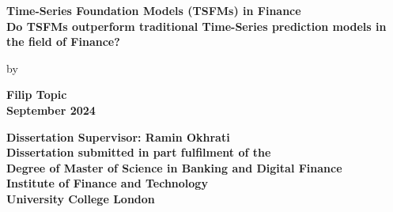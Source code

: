 \documentclass[12pt]{article}
\author{Filip Topic}
\numberwithin{figure}{section}
\numberwithin{table}{section}
\begin{document}
\begin{titlepage}
\begin{center}
    \vspace*{-3.5cm}
    \vfill %
    
    {\LARGE\textbf{Time-Series Foundation Models (TSFMs) in Finance\\
    Do TSFMs outperform traditional Time-Series prediction models in the field of Finance?\\}}

    \vspace{0.8cm}
    by\\
    \vspace{0.8cm}

    {\LARGE\textbf{Filip Topic\\}}
    \vspace{1.5cm}
    {\Large\textbf{September 2024}}

    \vfill

    \textbf{ 
    Dissertation Supervisor: Ramin Okhrati\\
    \vspace{1cm}
    Dissertation submitted in part fulfilment of the\\
    Degree of Master of Science in Banking and Digital Finance\\
    \vspace{1cm}
    Institute of Finance and Technology\\
    University College London\\}

    \vspace{2cm}
\end{center}
\end{titlepage}
\newpage


\tableofcontents 



\newpage 
\listoffigures%
\end{document}
